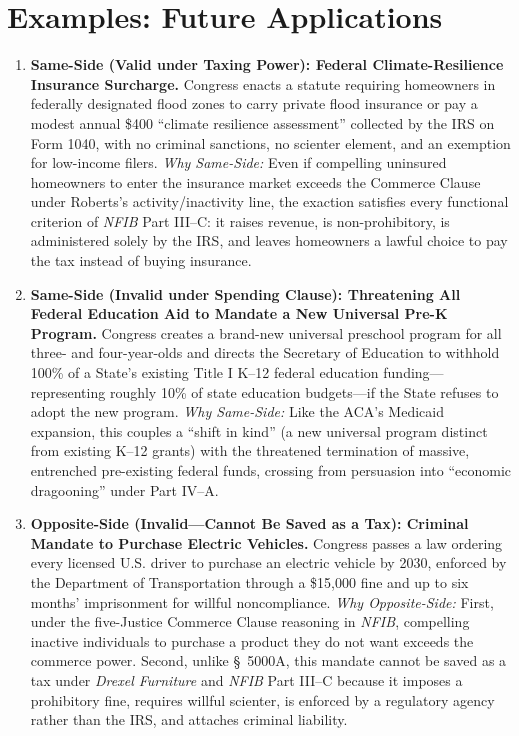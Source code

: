 \documentclass[12pt]{article}
\begin{document}
\section{Examples: Future Applications}
\begin{enumerate}
\item \textbf{Same-Side (Valid under Taxing Power): Federal Climate-Resilience Insurance Surcharge.} Congress enacts a statute requiring homeowners in federally designated flood zones to carry private flood insurance or pay a modest annual \$400 ``climate resilience assessment'' collected by the IRS on Form 1040, with no criminal sanctions, no scienter element, and an exemption for low-income filers. \textit{Why Same-Side:} Even if compelling uninsured homeowners to enter the insurance market exceeds the Commerce Clause under Roberts's activity/inactivity line, the exaction satisfies every functional criterion of \textit{NFIB} Part III--C: it raises revenue, is non-prohibitory, is administered solely by the IRS, and leaves homeowners a lawful choice to pay the tax instead of buying insurance.

\item \textbf{Same-Side (Invalid under Spending Clause): Threatening All Federal Education Aid to Mandate a New Universal Pre-K Program.} Congress creates a brand-new universal preschool program for all three- and four-year-olds and directs the Secretary of Education to withhold 100\% of a State's existing Title I K--12 federal education funding---representing roughly 10\% of state education budgets---if the State refuses to adopt the new program. \textit{Why Same-Side:} Like the ACA's Medicaid expansion, this couples a ``shift in kind'' (a new universal program distinct from existing K--12 grants) with the threatened termination of massive, entrenched pre-existing federal funds, crossing from persuasion into ``economic dragooning'' under Part IV--A.

\item \textbf{Opposite-Side (Invalid---Cannot Be Saved as a Tax): Criminal Mandate to Purchase Electric Vehicles.} Congress passes a law ordering every licensed U.S. driver to purchase an electric vehicle by 2030, enforced by the Department of Transportation through a \$15,000 fine and up to six months' imprisonment for willful noncompliance. \textit{Why Opposite-Side:} First, under the five-Justice Commerce Clause reasoning in \textit{NFIB}, compelling inactive individuals to purchase a product they do not want exceeds the commerce power. Second, unlike \S~5000A, this mandate cannot be saved as a tax under \textit{Drexel Furniture} and \textit{NFIB} Part III--C because it imposes a prohibitory fine, requires willful scienter, is enforced by a regulatory agency rather than the IRS, and attaches criminal liability.


\end{enumerate}
\end{document}
